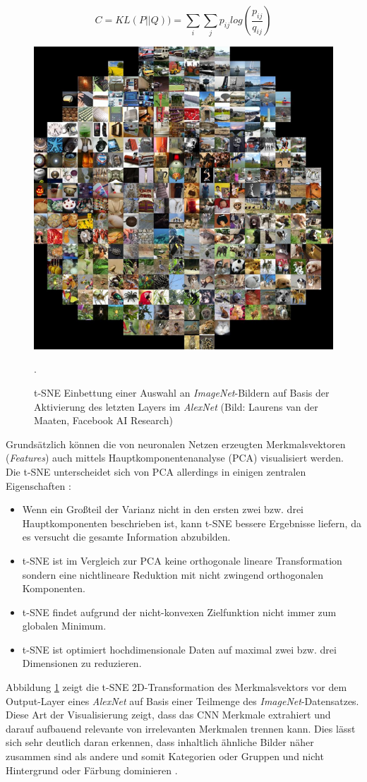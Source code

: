 \begin{equation}
\label{eq:tsne}
C = KL(P||Q) ) = \sum_{i}^{} \sum_{j}^{} p_{ij} log(\frac{p_{ij}}{q_{ij}})
\end{equation}


\begin{figure}
\centering
\includegraphics[width=0.5\linewidth]{images/4_t_sne}
\caption[]{t-SNE Einbettung einer Auswahl an \textit{ImageNet}-Bildern auf Basis der Aktivierung des letzten Layers im \textit{AlexNet} (Bild: Laurens van der Maaten, Facebook AI Research)}.
\label{fig:4_t_sne}
\end{figure}


Grundsätzlich können die von neuronalen Netzen erzeugten Merkmalsvektoren (\textit{Features}) auch mittels Hauptkomponentenanalyse (PCA) visualisiert werden. Die t-SNE unterscheidet sich von PCA allerdings in einigen zentralen Eigenschaften \cite[vgl. im Folgenden][]{Laurens2008}:

\begin{itemize}
\item Wenn ein Großteil der Varianz nicht in den ersten zwei bzw. drei Hauptkomponenten beschrieben ist, kann t-SNE bessere Ergebnisse liefern, da es versucht die gesamte Information abzubilden.
\item t-SNE ist im Vergleich zur PCA keine orthogonale lineare Transformation sondern eine nichtlineare Reduktion mit nicht zwingend orthogonalen Komponenten.
\item t-SNE findet aufgrund der nicht-konvexen Zielfunktion nicht immer zum globalen Minimum.
\item t-SNE ist optimiert hochdimensionale Daten auf maximal zwei bzw. drei Dimensionen zu reduzieren.
\end{itemize}



Abbildung \ref{fig:4_t_sne} zeigt die t-SNE 2D-Transformation des Merkmalsvektors vor dem Output-Layer eines \textit{AlexNet} auf Basis einer Teilmenge des \textit{ImageNet}-Datensatzes. Diese Art der Visualisierung zeigt, dass das CNN Merkmale extrahiert und darauf aufbauend relevante von irrelevanten Merkmalen trennen kann. Dies lässt sich sehr deutlich daran erkennen, dass inhaltlich ähnliche Bilder näher zusammen sind als andere und somit Kategorien oder Gruppen und nicht Hintergrund oder Färbung dominieren \cite[vgl.][]{Bell2015}.


